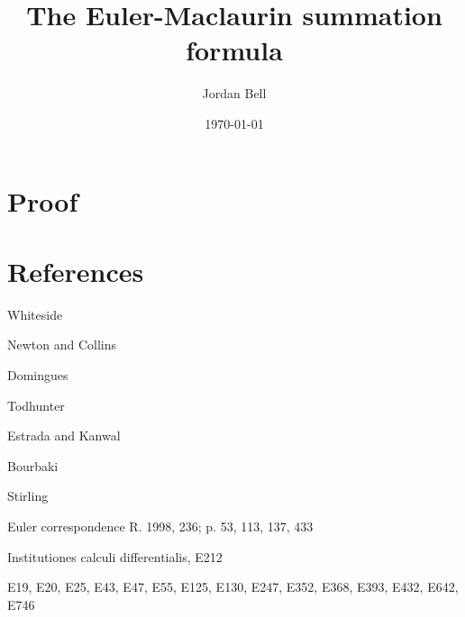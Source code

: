 \documentclass{amsart}
\begin{document}
\title{The Euler-Maclaurin summation formula}
\author{Jordan Bell}
\address{Department of Mathematics, University of Toronto, Toronto, Ontario, Canada}
\date{\today}

\maketitle

\section{Proof}



\section{References}
Whiteside \cite[pp.~44, 257]{whitesideVIII}

Newton and Collins \cite[pp.~186, 199]{bourbaki}

Domingues \cite[p.~44]{domingues}

Todhunter \cite[p.~192]{todhunter}

Estrada and Kanwal \cite[p.~36]{estrada}

Bourbaki \cite[Chapter VI]{bourbaki}

\cite[pp.~45, 160, 337, 475, 531]{commerciumII}

\cite[pp.~XL--XLIX]{I9}

Stirling \cite[p.~274]{tweddle2003}

Euler correspondence R. 1998, 236; p. 53, 113, 137, 433

Institutiones calculi differentialis, E212

E19, E20, E25, E43, E47, E55, E125, E130, E247, E352, E368, E393, E432, E642, E746

\nocite{*}



\end{document}
